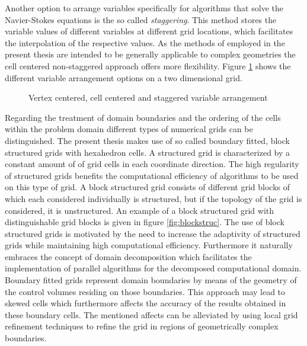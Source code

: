 Another option to arrange variables specifically for algorithms that solve the Navier-Stokes equations is the so called \emph{staggering}. This method stores the variable values of different variables at different grid locations, which facilitates the interpolation of the respective values. As the methods of employed in the present thesis are intended to be generally applicable to complex geometries the cell centered non-staggered approach offers more flexibility.  Figure \ref{fig:cellvertex} shows the different variable arrangement options on a two dimensional grid.

\begin{figure}
   \label{fig:cellvertex}
    \qquad
    \caption{Vertex centered, cell centered and staggered variable arrangement}
\end{figure}

Regarding the treatment of domain boundaries and the ordering of the cells within the problem domain different types of numerical grids can be distinguished. The present thesis makes use of so called boundary fitted, block structured grids with hexahedron cells. A structured grid is characterized by a constant amount of of grid cells in each coordinate direction. The high regularity of structured grids benefits the computational efficiency of algorithms to be used on this type of grid. A block structured grid consists of different grid blocks of which each considered individually is structured, but if the topology of the grid is considered, it is unstructured. An example of a block structured grid with distinguishable grid blocks is given in figure \ref{fig:blockstruc}. The use of block structured grids is motivated by the need to increase the adaptivity of structured grids while maintaining high computational efficiency. Furthermore it naturally embraces the concept of domain decomposition which facilitates the implementation of parallel algorithms for the decomposed computational domain. Boundary fitted grids represent domain boundaries by means of the geometry of the control volumes residing on those boundaries. This approach may lead to skewed cells which furthermore affects the accuracy of the results obtained in these boundary cells. The mentioned affects can be alleviated by using local grid refinement techniques to refine the grid in regions of geometrically complex boundaries.


